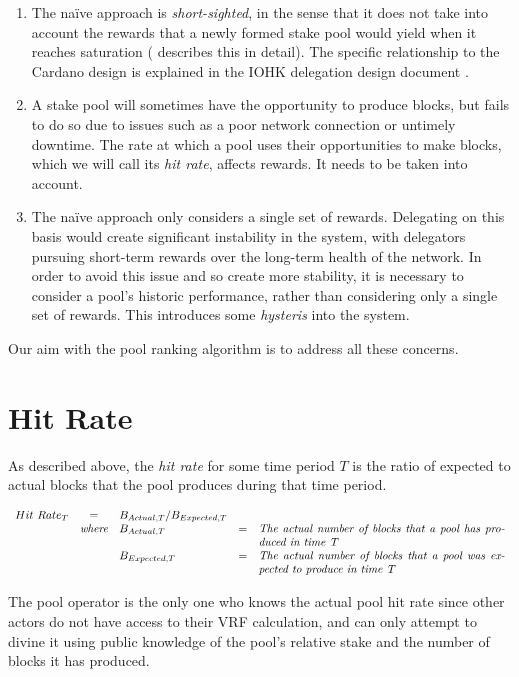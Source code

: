 \documentclass[11pt,a4paper,dvipsnames,twosided]{article}
\begin{document}
\begin{enumerate}
  \item
  The na\"{i}ve approach is \emph{short-sighted}, in the sense that it does not take into
  account the rewards that a newly formed stake pool would yield when it reaches saturation (\cite{bkks2018} describes this in detail).
  The specific relationship to the Cardano design is explained in the IOHK delegation design document \cite[Section 5.6]{delegation_design}.
  \item
    A stake pool will sometimes have the opportunity to produce blocks,
    but fails to do so due to issues such as a poor network connection or untimely downtime. The rate at
    which a pool uses their opportunities to make blocks, which we will call its \emph{hit rate}, affects rewards.
    It needs to be taken into account.
  \item
    The na\"{i}ve approach only considers a single set of rewards.  Delegating on this basis would create significant
    instability in the system, with delegators pursuing short-term rewards over the long-term health of the network.
    In order to avoid this issue and so create more stability, it is necessary to consider a pool's historic performance, rather than considering only a single set of rewards.
    This introduces some \emph{hysteris} into the system.
\end{enumerate}

Our aim with the pool ranking algorithm is to address all these concerns.

\section{Hit Rate}

As described above, the \emph{hit rate} for some time period $T$ is the ratio of expected to actual blocks
that the pool produces during that time period.

$$
  \begin{array}{lclcp{3in}}
  Hit~Rate_T &=& B_{Actual,T} / B_{Expected,T} \\
  & \textit{where} & B_{Actual,T} &=& \textit{The actual number of blocks that a pool has produced in time T}\\
  &  & B_{Expected,T} &=& \textit{The actual number of blocks that a pool was expected to produce in time T}
  \end{array}
$$

The pool operator is the only one who knows the actual pool
hit rate since other actors do not have access to their VRF calculation,
and  can only attempt to divine it using public knowledge of the
pool's relative stake and the number of blocks it has produced.
\end{document}
